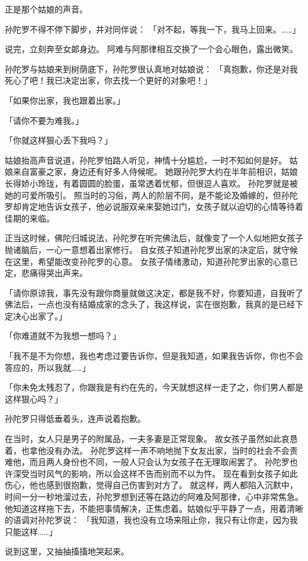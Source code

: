 \documentclass[twoside,openany]{book}
\begin{document}
正是那个姑娘的声音。

孙陀罗不得不停下脚步，并对同伴说：
「对不起，等我一下，我马上回来。……」

说完，立刻奔至女郞身边。
阿难与阿那律相互交换了一个会心眼色，露出微笑。

孙陀罗与姑娘来到树荫底下，孙陀罗很认真地对姑娘说：
「真抱歉，你还是对我死心了吧！我已决定出家，你去找一个更好的对象吧！」

「如果你出家，我也跟着出家。」

「请你不要为难我。」

「你就这样狠心丢下我吗？」

姑娘抬高声音说道，孙陀罗怕路人听见，神情十分尴尬，一时不知如何是好。
姑娘来自富豪之家，身边还有好多人侍候呢。
她跟孙陀罗大约在半年前相识，姑娘长得娇小玲珑，有着圆圆的脸蛋，虽常透着忧郁，但很逗人喜欢。
孙陀罗就是被她的可爱所吸引。
照当时的习俗，两人的阶层不同，是不能论及婚嫁的，但孙陀罗却肯定地告诉女孩子，他必说服双亲来娶她过门，女孩子就以迫切的心情等待着佳期的来临。

正当这时候，佛陀归城说法，孙陀罗在听完佛法后，就像变了一个人似地把女孩子抛诸脑后，一心一意想着出家修行。
自女孩子知道孙陀罗出家的决定后，就守候在这里，希望能改变孙陀罗的心意。
女孩子情绪激动，知道孙陀罗出家的心意已定，悲痛得哭出声来。

「请你原谅我，事先没有跟你商量就做这决定，都是我不好，你要知道，自我听了佛法后，一点也没有结婚成家的念头了，我这样说，实在很抱歉，我真的是已经下定决心出家了。」

「你难道就不为我想一想吗？」

「我不是不为你想，我也考虑过要告诉你，但是我知道，如果我告诉你，你也不会答应的，所以我就……」

「你未免太残忍了，你跟我是有约在先的，今天就想这样一走了之，你们男人都是这样狠心吗？」

孙陀罗只得低垂着头，连声说着抱歉。

在当时，女人只是男子的附属品，一夫多妻是正常现象。
故女孩子虽然如此哀恳着，也拿他没有办法。
孙陀罗这样一声不响地抛下女友出家，当时的社会不会责难他，而且两人身份也不同，一般人只会认为女孩子在无理取闹罢了。
孙陀罗也许深受当时风气的影响，所以会这样不告而别而不以为忤。
现在看到女孩子如此伤心，他也感到很抱歉，觉得自己伤害到对方了。
就这样，两人都陷入沉默中，时间一分一秒地溜过去，孙陀罗想到还等在路边的阿难及阿那律，心中非常焦急。
他知道这样拖下去，不能把事情解决，正焦虑着。姑娘似乎平静了一点，用着清晰的语调对孙陀罗说：
「我知道，我也没有立场来阻止你，我只有让你走，因为我只能这样……」

说到这里，又抽抽搐搐地哭起来。
\end{document}
